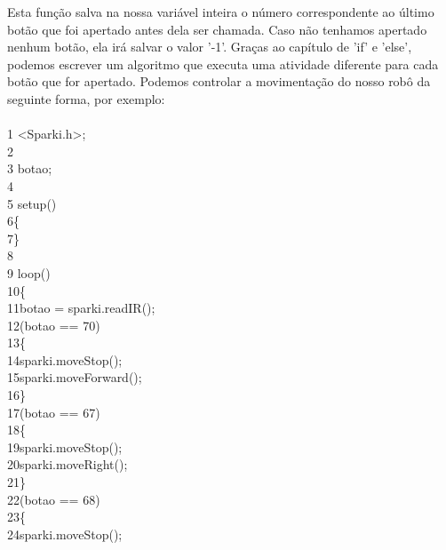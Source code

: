 \documentclass[conference]{IEEEtran}
\begin{document}
\par
Esta função salva na nossa variável inteira o número correspondente ao último botão que foi apertado antes dela ser chamada. Caso não tenhamos apertado nenhum botão, ela irá salvar o valor '-1'. Graças ao capítulo de 'if' e 'else', podemos escrever um algoritmo que executa uma atividade diferente para cada botão que for apertado. Podemos controlar a movimentação do nosso robô da seguinte forma, por exemplo:
\\
\\
{\selectfont
    {\color{gray}1} <Sparki.h>;\\
    {\color{gray}2}\\
    {\color{gray}3} botao;\\
    {\color{gray}4}\\
    {\color{gray}5} setup()\\
    {\color{gray}6}\quad\{\\
    {\color{gray}7}\quad\}\\
    {\color{gray}8}\\
    {\color{gray}9} loop()\\
    {\color{gray}10}\quad\{\\
    {\color{gray}11}\quad\quad botao = sparki.readIR();\\
    {\color{gray}12}\quad{}(botao == 70)\\
    {\color{gray}13}\quad\quad \{\\
    {\color{gray}14}\quad\quad\quad sparki.moveStop();\\
    {\color{gray}15}\quad\quad\quad sparki.moveForward();\\
    {\color{gray}16}\quad\quad \}\\
    {\color{gray}17}\quad{}(botao == 67)\\
    {\color{gray}18}\quad\quad \{\\
    {\color{gray}19}\quad\quad\quad sparki.moveStop();\\
    {\color{gray}20}\quad\quad\quad sparki.moveRight();\\
    {\color{gray}21}\quad\quad \}\\
    {\color{gray}22}\quad{}(botao == 68)\\
    {\color{gray}23}\quad\quad \{\\
    {\color{gray}24}\quad\quad\quad sparki.moveStop();\\
}
\end{document}
